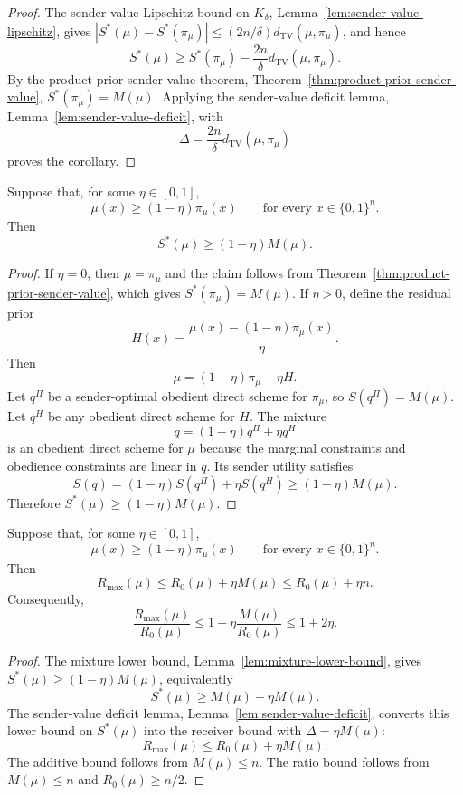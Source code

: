 \documentclass[format=acmsmall, review=false]{acmart}
\newcommand{\TV}{d_{\mathrm{TV}}}
\begin{document}
\begin{proof}
The sender-value Lipschitz bound on $K_\delta$,
Lemma~\ref{lem:sender-value-lipschitz}, gives
$|S^*(\mu)-S^*(\pi_\mu)|
\leq (2n/\delta)\TV(\mu,\pi_\mu)$, and hence
\[
S^*(\mu)\geq S^*(\pi_\mu)-\frac{2n}{\delta}\TV(\mu,\pi_\mu).
\]
By the product-prior sender value theorem,
Theorem~\ref{thm:product-prior-sender-value}, $S^*(\pi_\mu)=M(\mu)$. Applying
the sender-value deficit lemma, Lemma~\ref{lem:sender-value-deficit}, with
\[
\Delta=\frac{2n}{\delta}\TV(\mu,\pi_\mu)
\]
proves the corollary.
\end{proof}

\begin{lemma}
\label{lem:mixture-lower-bound}
Suppose that, for some $\eta\in[0,1]$,
\[
\mu(x)\geq (1-\eta)\pi_\mu(x)
\qquad\text{for every }x\in\{0,1\}^n.
\]
Then
\[
S^*(\mu)\geq (1-\eta)M(\mu).
\]
\end{lemma}

\begin{proof}
If $\eta=0$, then $\mu=\pi_\mu$ and the claim follows from
Theorem~\ref{thm:product-prior-sender-value}, which gives
$S^*(\pi_\mu)=M(\mu)$. If $\eta>0$, define the residual prior
\[
H(x)=\frac{\mu(x)-(1-\eta)\pi_\mu(x)}{\eta}.
\]
Then
\[
\mu=(1-\eta)\pi_\mu+\eta H.
\]
Let $q^\Pi$ be a sender-optimal obedient direct scheme for $\pi_\mu$, so
$S(q^\Pi)=M(\mu)$. Let $q^H$ be any obedient direct scheme for $H$. The mixture
\[
q=(1-\eta)q^\Pi+\eta q^H
\]
is an obedient direct scheme for $\mu$ because the marginal constraints and
obedience constraints are linear in $q$. Its sender utility satisfies
\[
S(q)=(1-\eta)S(q^\Pi)+\eta S(q^H)\geq (1-\eta)M(\mu).
\]
Therefore $S^*(\mu)\geq (1-\eta)M(\mu)$.
\end{proof}

\begin{corollary}
\label{cor:pointwise-domination-stability}
Suppose that, for some $\eta\in[0,1]$,
\[
\mu(x)\geq (1-\eta)\pi_\mu(x)
\qquad\text{for every }x\in\{0,1\}^n.
\]
Then
\[
R_{\max}(\mu)\leq R_0(\mu)+\eta M(\mu)\leq R_0(\mu)+\eta n.
\]
Consequently,
\[
\frac{R_{\max}(\mu)}{R_0(\mu)}
\leq
1+\eta\frac{M(\mu)}{R_0(\mu)}
\leq
1+2\eta.
\]
\end{corollary}

\begin{proof}
The mixture lower bound, Lemma~\ref{lem:mixture-lower-bound}, gives
$S^*(\mu)\geq (1-\eta)M(\mu)$, equivalently
\[
S^*(\mu)\geq M(\mu)-\eta M(\mu).
\]
The sender-value deficit lemma, Lemma~\ref{lem:sender-value-deficit}, converts
this lower bound on $S^*(\mu)$ into the receiver bound with
$\Delta=\eta M(\mu)$:
\[
R_{\max}(\mu)\leq R_0(\mu)+\eta M(\mu).
\]
The additive bound follows from $M(\mu)\leq n$. The ratio bound follows from
$M(\mu)\leq n$ and $R_0(\mu)\geq n/2$.
\end{proof}
\end{document}

